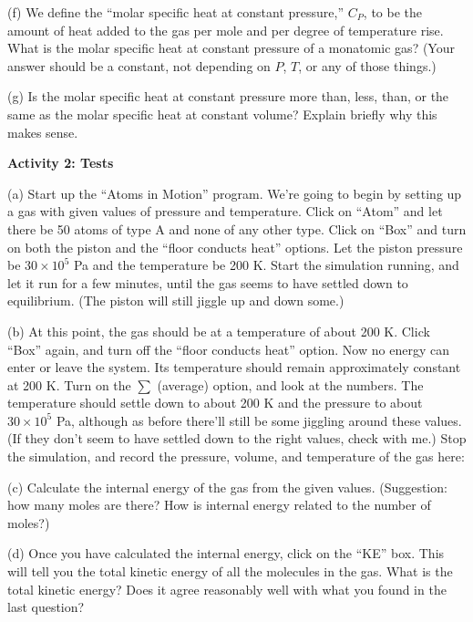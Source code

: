 \answerspace{1.1in}

\pagebreak[3]
(f) We define the ``molar specific heat at constant pressure,''
$C_P$, to be the amount of heat added to the gas per mole and per
degree of temperature rise.  What is the molar specific heat at
constant pressure of a monatomic gas?  (Your answer should be a
constant, not depending on $P$, $T$, or any of those things.)

\answerspace{1.4in}

(g) Is the molar specific heat at constant pressure more than, less, than, or
the same as the molar specific heat at constant volume?  Explain
briefly why this makes sense.

\answerspace{1.4in}

\textbf{Activity 2: Tests}

(a) Start up the ``Atoms in Motion'' program.  We're going to begin
by setting up a gas with given values of pressure and temperature.
Click on ``Atom''
and let there be 50 atoms of type A and none of any other type.
Click on ``Box'' and turn on both the piston and the ``floor conducts
heat'' options.  Let the piston pressure be $30\times 10^5$ Pa and
the temperature be 200 K.  Start the simulation running, and let it
run for a few minutes, until the gas seems to have settled down
to equilibrium.  (The piston will still jiggle up and down some.)

(b) At this point, the gas should be at a temperature of about 200 K.
Click ``Box'' again, and turn off the ``floor conducts heat'' option.
Now no energy can enter or leave the system.  Its temperature should remain
approximately constant at 200 K.  Turn on the $\sum$ (average) option,
and look at the numbers.  The temperature should settle down to about 200 K
and the pressure to about $30\times 10^5$ Pa,
although as before there'll still be some jiggling around these values.  
(If they don't seem to have settled down to the right values, check with me.)
Stop the simulation, and 
record the pressure, volume, and temperature of the gas here:

\answerspace{1in}

(c) Calculate the internal energy of the gas from the given values.  
(Suggestion: how many moles are there?  How is internal energy related
to the number of moles?)

\answerspace{1.5in}

\pagebreak[3]
(d) Once you have calculated the internal energy, click on the ``KE''
box.  This will tell you the total kinetic energy of all the molecules
in the gas.  What is the total kinetic energy?  
Does it agree reasonably well with what you found in the last question?
\label{ke}

